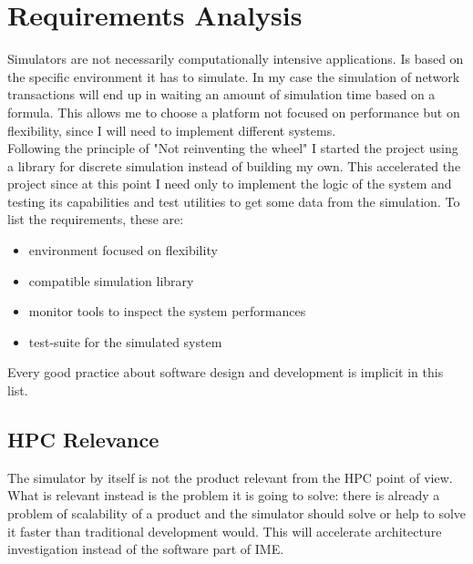 
\section{Requirements Analysis}\label{requirements}
Simulators are not necessarily computationally intensive applications. Is based
on the specific environment it has to simulate. In my case the simulation of
network transactions will end up in waiting an amount of simulation time based
on a formula. This allows me to choose a platform not focused on performance but
on flexibility, since I will need to implement different systems. \\
Following the principle of "Not reinventing the wheel" I started the project
using a library for discrete simulation instead of building my own. This
accelerated the project since at this point I need only to implement the logic
of the system and testing its capabilities and test utilities to get some data
from the simulation.
To list the requirements, these are:
\begin{itemize}
    \item environment focused on flexibility
    \item compatible simulation library
    \item monitor tools to inspect the system performances
    \item test-suite for the simulated system 
\end{itemize}

Every good practice about software design and development is implicit in this
list.

\subsection{HPC Relevance}
The simulator by itself is not the product relevant from the HPC point of view.
What is relevant instead is the problem it is going to solve: there is already a
problem of scalability of a product and the simulator should solve or help to
solve it faster than traditional development would. This will accelerate
architecture investigation instead of the software part of IME.


